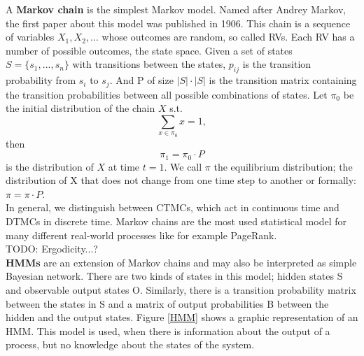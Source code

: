 A \textbf{Markov chain} is the simplest Markov model. Named after Andrey Markov, the first paper about this model was published in 1906\cite{Markov}. This chain is a sequence of variables $X_1, X_2, ...$ whose outcomes are random, so called \acfp{RV}. Each \ac{RV} has a number of possible outcomes, the state space. Given a set of states $S = \{s_1, ..., s_n\}$ with transitions between the states, $p_{ij}$ is the transition probability from $s_i$ to $s_j$. And P of size $|S|\cdot|S|$ is the transition matrix containing the transition probabilities between all possible combinations of states.\newline
Let $\pi_0$ be the initial distribution of the chain $X$ s.t.\newline
\[\sum_{x \in \pi_0}{x} = 1,\]\newline
then\newline
\[\pi_1 = \pi_0 \cdot P\]\newline
is the distribution of $X$ at time $t=1$. We call $\pi$ the equilibrium distribution; the distribution of X that does not change from one time step to another or formally:\newline
$\pi = \pi \cdot P$.\\
In general, we distinguish between \acp{CTMC}, which act in continuous time and \acp{DTMC} in discrete time.\newline
Markov chains are the most used statistical model for many different real-world processes like for example PageRank\cite{MC}.\\
TODO: Ergodicity...?\\
\textbf{\acp{HMM}} are an extension of Markov chains and may also be interpreted as simple Bayesian network. There are two kinds of states in this model; hidden states S and observable output states O. Similarly, there is a transition probability matrix between the states in S and a matrix of output probabilities B between the hidden and the output states. Figure \ref{HMM} shows a graphic representation of an \ac{HMM}.\newline
This model is used, when there is information about the output of a process, but no knowledge about the states of the system.\\
